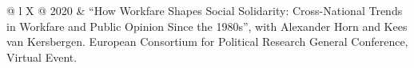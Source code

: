 \documentclass[letterpaper,fontsize=10.5pt]{scrartcl}
\begin{document}
\begin{longtblr}[entry=none,label=none]{@{} l X @{} }
	2020 & ``How Workfare Shapes Social Solidarity: Cross-National Trends in Workfare and Public Opinion Since the 1980s'', with Alexander Horn and Kees van Kersbergen. European Consortium for Political Research General Conference, Virtual Event.                                     \\



\end{longtblr}
\end{document}
